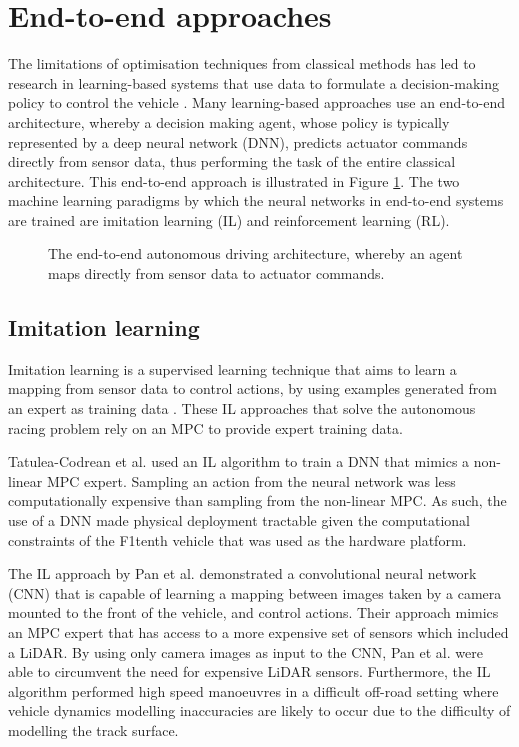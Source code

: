 \section{End-to-end approaches}
\label{sec:end_to_end}

The limitations of optimisation techniques from classical methods has led to research in learning-based systems that use data to formulate a decision-making policy to control the vehicle \cite{Fuchs2021}.
Many learning-based approaches use an end-to-end architecture, whereby a decision making agent, whose policy is typically represented by a deep neural network (DNN), predicts actuator commands directly from sensor data, thus performing the task of the entire classical architecture.
This end-to-end approach is illustrated in Figure \ref{fig:end_to_end}.
The two machine learning paradigms by which the neural networks in end-to-end systems are trained are imitation learning (IL) and reinforcement learning (RL).

\begin{figure}[h]
    \centering
    
    \caption[The end to end autonomous driving architecture]{The end-to-end autonomous driving architecture, whereby an agent maps directly from sensor data to actuator commands.}
    \label{fig:end_to_end}
\end{figure}

\subsection{Imitation learning}
\label{sec:imitation_learning}

Imitation learning is a supervised learning technique that aims to learn a mapping from sensor data to control actions, by using examples generated from an expert as training data \cite{Tatulea-Codrean2020, Pan2017a, lee2019, Osa_2018}.
These IL approaches that solve the autonomous racing problem rely on an MPC to provide expert training data.

Tatulea-Codrean et al. \cite{Tatulea-Codrean2020} used an IL algorithm to train a DNN that mimics a non-linear MPC expert. 
Sampling an action from the neural network was less computationally expensive than sampling from the non-linear MPC. 
As such, the use of a DNN made physical deployment tractable given the computational constraints of the F1tenth vehicle that was used as the hardware platform.

The IL approach by Pan et al. \cite{Pan2017a} demonstrated a convolutional neural network (CNN) that is capable of learning a mapping between images taken by a camera mounted to the front of the vehicle, and control actions.
Their approach mimics an MPC expert that has access to a more expensive set of sensors which included a LiDAR.
By using only camera images as input to the CNN, Pan et al. \cite{Pan2017a} were able to circumvent the need for expensive LiDAR sensors.
Furthermore, the IL algorithm performed high speed manoeuvres in a difficult off-road setting where vehicle dynamics modelling inaccuracies are likely to occur due to the difficulty of modelling the track surface.

